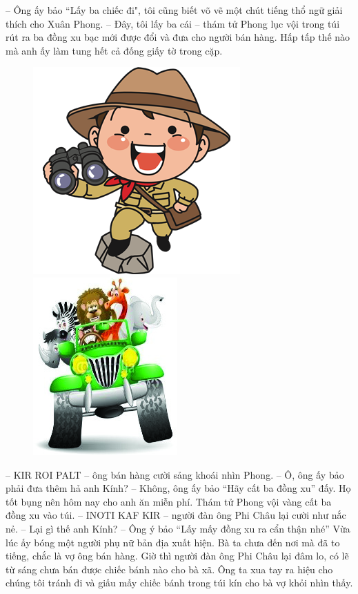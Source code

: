 	\vskip 0.1cm
	-- Ông ấy bảo ``Lấy ba chiếc đi", tôi cũng biết võ vẽ một chút tiếng thổ ngữ giải thích cho Xuân Phong.
		\vskip 0.1cm
	-- Đây, tôi lấy ba cái -- thám tử Phong lục vội trong túi rút ra ba đồng xu bạc mới được đổi và đưa cho người bán hàng. Hấp tấp thế nào mà anh ấy làm tung hết cả đống giấy tờ trong cặp. 
		\begin{figure}[H]
			\centering
			\vspace*{-5pt}
			\captionsetup{labelformat= empty, justification=centering}
			\includegraphics[height=0.4\linewidth]{1}\quad
			\includegraphics[height=0.4\linewidth]{2}
			\vspace*{-15pt}
		\end{figure}
	-- KIR ROI PALT -- ông bán hàng cười sảng khoái nhìn Phong. 
	\vskip 0.1cm
	-- Ô, ông ấy bảo phải đưa thêm hả anh Kính? 
	\vskip 0.1cm
	-- Không, ông ấy bảo “Hãy cất ba đồng xu” đấy. Họ tốt bụng nên hôm nay cho anh ăn miễn phí.
	\vskip 0.1cm 
	Thám tử Phong vội vàng cất ba đồng xu vào túi. 
	\vskip 0.1cm
	-- INOTI KAF KIR -- người đàn ông Phi Châu lại cười như nắc nẻ. 
	\vskip 0.1cm
	-- Lại gì thế anh Kính?
	\vskip 0.1cm
	-- Ông ý bảo “Lấy mấy đồng xu ra cẩn thận nhé” 
	\vskip 0.1cm
	Vừa lúc ấy bóng một người phụ nữ bản địa xuất hiện. Bà ta chưa đến nơi mà đã to tiếng, chắc là vợ ông bán hàng. Giờ thì người đàn ông Phi Châu lại đâm lo, có lẽ từ sáng chưa bán được chiếc bánh nào cho bà xã. Ông ta xua tay ra hiệu cho chúng tôi tránh đi và giấu mấy chiếc bánh trong túi kín cho bà vợ khỏi nhìn thấy. 
